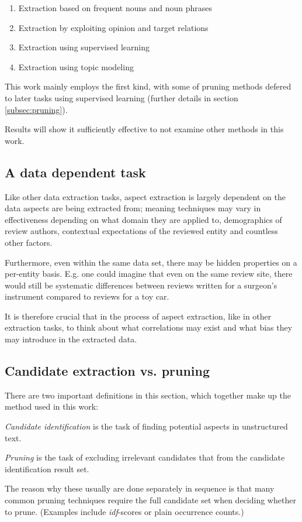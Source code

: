 \documentclass[a4paper,11pt]{kth-mag}
\begin{document}
\begin{enumerate}
\item Extraction based on frequent nouns and noun phrases
\item Extraction by exploiting opinion and target relations
\item Extraction using supervised learning
\item Extraction using topic modeling
\end{enumerate}
This work mainly employs the first kind, with some of pruning methods defered to
later tasks using supervised learning (further details in section
\ref{subsec:pruning}).

Results will show it sufficiently effective to not examine other methods in
this work.

\subsection{A data dependent task}
Like other data extraction tasks, aspect extraction is largely dependent on the data
aspects are being extracted from; meaning techniques may vary in effectiveness depending
on what domain they are applied to, demographics of review authors,
contextual expectations of the reviewed entity and countless other factors.

Furthermore, even within the same data set, there may be hidden properties on a
per-entity basis. E.g. one could imagine that even on the same review site, there would still
be systematic differences between reviews written for a surgeon's instrument
compared to reviews for a toy car.

It is therefore crucial that in the process of aspect extraction, like in other extraction tasks,
to think about what correlations may exist and what bias they may introduce in the extracted data.


\subsection{Candidate extraction vs. pruning}
There are two important definitions in this section,
which together make up the method used in this work:

\emph{Candidate identification} is the task of finding potential aspects in unstructured text.

\emph{Pruning} is the task of excluding irrelevant candidates that from the candidate
identification result set.

The reason why these usually are done separately in sequence is that many common pruning
techniques require the full candidate set when deciding whether to prune.
(Examples include \emph{idf}-scores or plain occurrence counts.)
\end{document}
